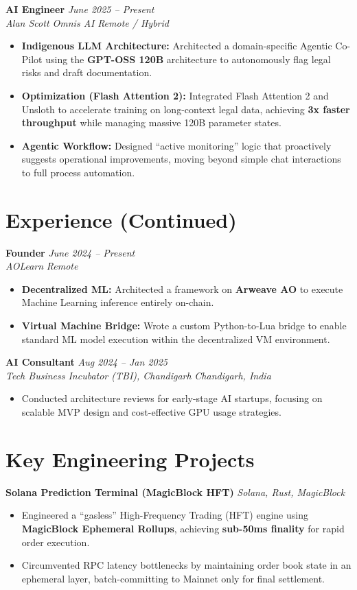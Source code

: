\documentclass[a4paper,11pt]{article}
\newcommand{\entry}[4]{
    \par\vspace{0.4em}\noindent
    {\textbf{\large #1}} \hfill {\textit{\color{secondary} #2}} \\
    {\textit{\color{secondary} #3}} \hfill {\textit{\small #4}} \par
    \vspace{0.1em}
}
\newenvironment{tightlist}{
    \begin{itemize}
    \setlength{\itemsep}{1pt}
    \setlength{\parskip}{0pt}
    \setlength{\parsep}{0pt}
}{
    \end{itemize}
}
\begin{document}
\entry{AI Engineer}{June 2025 – Present}{Alan Scott Omnis AI}{Remote / Hybrid}
\begin{tightlist}
    \item \textbf{Indigenous LLM Architecture:} Architected a domain-specific Agentic Co-Pilot using the \textbf{GPT-OSS 120B} architecture to autonomously flag legal risks and draft documentation.
    \item \textbf{Optimization (Flash Attention 2):} Integrated Flash Attention 2 and Unsloth to accelerate training on long-context legal data, achieving \textbf{3x faster throughput} while managing massive 120B parameter states.
    \item \textbf{Agentic Workflow:} Designed ``active monitoring'' logic that proactively suggests operational improvements, moving beyond simple chat interactions to full process automation.
\end{tightlist}

\newpage 

\section*{Experience (Continued)}

\entry{Founder}{June 2024 – Present}{AOLearn}{Remote}
\begin{tightlist}
    \item \textbf{Decentralized ML:} Architected a framework on \textbf{Arweave AO} to execute Machine Learning inference entirely on-chain.
    \item \textbf{Virtual Machine Bridge:} Wrote a custom Python-to-Lua bridge to enable standard ML model execution within the decentralized VM environment.
\end{tightlist}

\entry{AI Consultant}{Aug 2024 – Jan 2025}{Tech Business Incubator (TBI), Chandigarh}{Chandigarh, India}
\begin{tightlist}
    \item Conducted architecture reviews for early-stage AI startups, focusing on scalable MVP design and cost-effective GPU usage strategies.
\end{tightlist}
\section*{Key Engineering Projects}

\noindent
\textbf{Solana Prediction Terminal (MagicBlock HFT)} \hfill \textit{Solana, Rust, MagicBlock}
\begin{itemize} \itemsep0em
    \item Engineered a ``gasless'' High-Frequency Trading (HFT) engine using \textbf{MagicBlock Ephemeral Rollups}, achieving \textbf{sub-50ms finality} for rapid order execution.
    \item Circumvented RPC latency bottlenecks by maintaining order book state in an ephemeral layer, batch-committing to Mainnet only for final settlement.
\end{itemize}
\vspace{2mm} %
\end{document}

